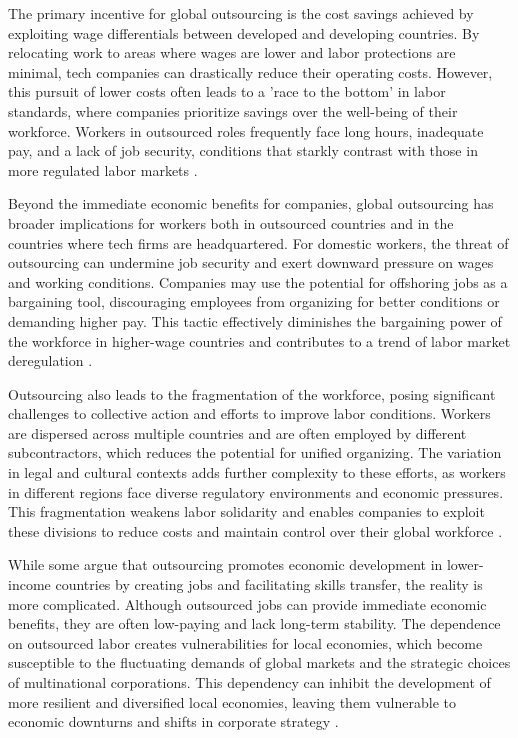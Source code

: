 The primary incentive for global outsourcing is the cost savings achieved by exploiting wage differentials between developed and developing countries. By relocating work to areas where wages are lower and labor protections are minimal, tech companies can drastically reduce their operating costs. However, this pursuit of lower costs often leads to a 'race to the bottom' in labor standards, where companies prioritize savings over the well-being of their workforce. Workers in outsourced roles frequently face long hours, inadequate pay, and a lack of job security, conditions that starkly contrast with those in more regulated labor markets \cite[pp.~230-233]{friedman2012world}.

Beyond the immediate economic benefits for companies, global outsourcing has broader implications for workers both in outsourced countries and in the countries where tech firms are headquartered. For domestic workers, the threat of outsourcing can undermine job security and exert downward pressure on wages and working conditions. Companies may use the potential for offshoring jobs as a bargaining tool, discouraging employees from organizing for better conditions or demanding higher pay. This tactic effectively diminishes the bargaining power of the workforce in higher-wage countries and contributes to a trend of labor market deregulation \cite[pp.~189-192]{stiglitz2017globalization}.

Outsourcing also leads to the fragmentation of the workforce, posing significant challenges to collective action and efforts to improve labor conditions. Workers are dispersed across multiple countries and are often employed by different subcontractors, which reduces the potential for unified organizing. The variation in legal and cultural contexts adds further complexity to these efforts, as workers in different regions face diverse regulatory environments and economic pressures. This fragmentation weakens labor solidarity and enables companies to exploit these divisions to reduce costs and maintain control over their global workforce \cite[pp.~45-47]{milberg2013outsourcing}.

While some argue that outsourcing promotes economic development in lower-income countries by creating jobs and facilitating skills transfer, the reality is more complicated. Although outsourced jobs can provide immediate economic benefits, they are often low-paying and lack long-term stability. The dependence on outsourced labor creates vulnerabilities for local economies, which become susceptible to the fluctuating demands of global markets and the strategic choices of multinational corporations. This dependency can inhibit the development of more resilient and diversified local economies, leaving them vulnerable to economic downturns and shifts in corporate strategy \cite[pp.~98-101]{rodrik2011globalization}.


